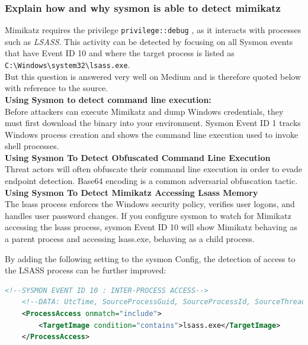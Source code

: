 \subsubsection{Explain how and why sysmon is able to detect mimikatz}
Mimikatz requires the privilege \lstinline|privilege::debug| , as it interacts with processes such as \textit{LSASS}. This activity can be detected by focusing on all Sysmon events that have Event ID 10 and where the target process is listed as \lstinline|C:\Windows\system32\lsass.exe|.\\

But this question is answered very well on Medium and is therefore quoted below with reference to the source.\\

\textbf{Using Sysmon to detect command line execution:}\\
Before attackers can execute Mimikatz and dump Windows credentials, they must first download the binary into your environment. Sysmon Event ID 1 tracks Windows process creation and shows the command line execution used to invoke shell processes.\\

\textbf{Using Sysmon To Detect Obfuscated Command Line Execution}\\
Threat actors will often obfuscate their command line execution in order to evade endpoint detection. Base64 encoding is a common adversarial obfuscation tactic.\\

\textbf{Using Sysmon To Detect Mimikatz Accessing Lsass Memory}\\
The lsass process enforces the Windows security policy, verifies user logons, and handles user password changes. If you configure sysmon to watch for Mimikatz accessing the lsass process, sysmon Event ID 10 will show Mimikatz behaving as a parent process and accessing lsass.exe, behaving as a child process.

By adding the following setting to the sysmon Config, the detection of access to the LSASS process can be further improved:

\begin{lstlisting}[language=XML]
    <!--SYSMON EVENT ID 10 : INTER-PROCESS ACCESS-->
    <!--DATA: UtcTime, SourceProcessGuid, SourceProcessId, SourceThreadId, SourceImage, TargetProcessGuid, TargetProcessId, TargetImage, GrantedAccess, CallTrace-->
    <ProcessAccess onmatch="include">
        <TargetImage condition="contains">lsass.exe</TargetImage>
    </ProcessAccess>
\end{lstlisting}

